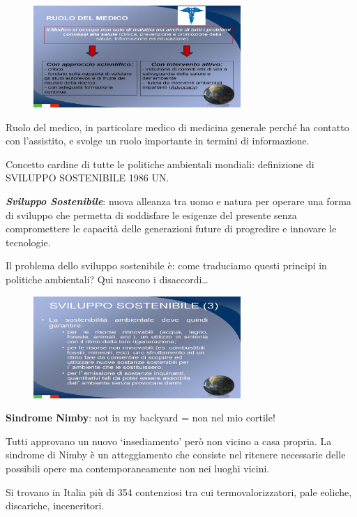 \begin{figure}[!ht]
\centering
	\includegraphics[width=0.7\textwidth]{22/image5.jpeg}
	\end{figure}

Ruolo del medico, in particolare medico di medicina generale perché ha
contatto con l'assistito, e svolge un ruolo importante in termini di
informazione.

Concetto cardine di tutte le politiche ambientali mondiali: definizione
di SVILUPPO SOSTENIBILE 1986 UN.

\textbf{\emph{Sviluppo Sostenibile}}: nuova alleanza tra uomo e natura
per operare una forma di sviluppo che permetta di soddisfare le esigenze
del presente senza compromettere le capacità delle generazioni future di
progredire e innovare le tecnologie.

Il problema dello sviluppo sostenibile è: come traduciamo questi
principi in politiche ambientali? Qui nascono i disaccordi\ldots{}

\begin{figure}[!ht]
\centering
	\includegraphics[width=0.7\textwidth]{22/image6.jpeg}
	\end{figure}
	
\textbf{Sindrome Nimby}: not in my backyard = non nel mio cortile!

Tutti approvano un nuovo `insediamento' però non vicino a casa propria.
La sindrome di Nimby è un atteggiamento che consiste nel ritenere
necessarie delle possibili opere ma contemporaneamente non nei luoghi
vicini.

Si trovano in Italia più di 354 contenziosi tra cui termovalorizzatori,
pale eoliche, discariche, inceneritori.

